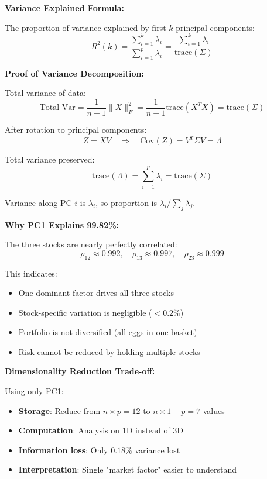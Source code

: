 \documentclass[12pt]{article}
\begin{document}
\begin{explanation}

\textbf{Variance Explained Formula:}

The proportion of variance explained by first $k$ principal components:
\[
R^2(k) = \frac{\sum_{i=1}^k \lambda_i}{\sum_{i=1}^p \lambda_i} = \frac{\sum_{i=1}^k \lambda_i}{\text{trace}(\Sigma)}
\]

\textbf{Proof of Variance Decomposition:}

Total variance of data:
\[
\text{Total Var} = \frac{1}{n-1}\|X\|_F^2 = \frac{1}{n-1}\text{trace}(X^TX) = \text{trace}(\Sigma)
\]

After rotation to principal components:
\[
Z = XV \quad \Rightarrow \quad \text{Cov}(Z) = V^T\Sigma V = \Lambda
\]

Total variance preserved:
\[
\text{trace}(\Lambda) = \sum_{i=1}^p \lambda_i = \text{trace}(\Sigma)
\]

Variance along PC $i$ is $\lambda_i$, so proportion is $\lambda_i / \sum_j \lambda_j$.

\textbf{Why PC1 Explains 99.82\%:}

The three stocks are nearly perfectly correlated:
\[
\rho_{12} \approx 0.992, \quad \rho_{13} \approx 0.997, \quad \rho_{23} \approx 0.999
\]

This indicates:
\begin{itemize}
    \item One dominant factor drives all three stocks
    \item Stock-specific variation is negligible ($< 0.2\%$)
    \item Portfolio is not diversified (all eggs in one basket)
    \item Risk cannot be reduced by holding multiple stocks
\end{itemize}

\textbf{Dimensionality Reduction Trade-off:}

Using only PC1:
\begin{itemize}
    \item \textbf{Storage}: Reduce from $n \times p = 12$ to $n \times 1 + p = 7$ values
    \item \textbf{Computation}: Analysis on 1D instead of 3D
    \item \textbf{Information loss}: Only $0.18\%$ variance lost
    \item \textbf{Interpretation}: Single "market factor" easier to understand
\end{itemize}


\end{explanation}
\end{document}
